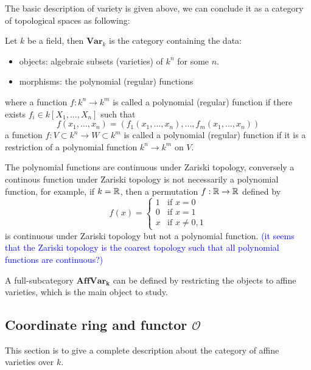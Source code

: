 The basic description of variety is given above, we can conclude it as a category of topological spaces as following:

\begin{definition}
    Let \(k\) be a field, then \(\mathbf{Var}_k\) is the category containing the data:
    \begin{itemize}
        \item objects: algebraic subsets (varieties) of \(k^n\) for some \(n\).
        \item morphisms: the polynomial (regular) functions 
    \end{itemize}
    where a function \(f: k^n \to k^m\) is called a polynomial (regular)  function if there exists \(f_i \in k[X_1,...,X_n]\) such that
    \[f(x_1,...,x_n) = (f_1(x_1,...,x_n),...,f_m(x_1,...,x_n))\]
    a function \(f: V \subset k^n \to W \subset k^m\) is called a polynomial (regular) function if it is a restriction of a polynomial function \(k^n \to k^m\) on \(V\).
\end{definition}

\begin{remark}
    The polynomial functions are continuous under Zariski topology, conversely a continous function under Zariski topology is not necessarily a polynomial function, for example, if \(k = \mathbb{R}\), then a permutation \(f: \mathbb{R} \to \mathbb{R}\) defined by
    \[f(x) = \begin{cases}
        1 & \text{if } x = 0 \\
        0 & \text{if } x = 1 \\
        x & \text{if } x \neq 0,1
    \end{cases}\]
    is continuous under Zariski topology but not a polynomial function. \textcolor{blue}{(it seems that the Zariski topology is the coarest topology such that all polynomial functions are continuous?)}  
\end{remark}

A full-subcategory \(\mathbf{AffVar_k}\) can be defined by restricting the objects to affine varieties, which is the main object to study.



\subsection{Coordinate ring and functor \(\mathcal{O}\)}

This section is to give a complete description about the category of affine varieties over \(k\).

